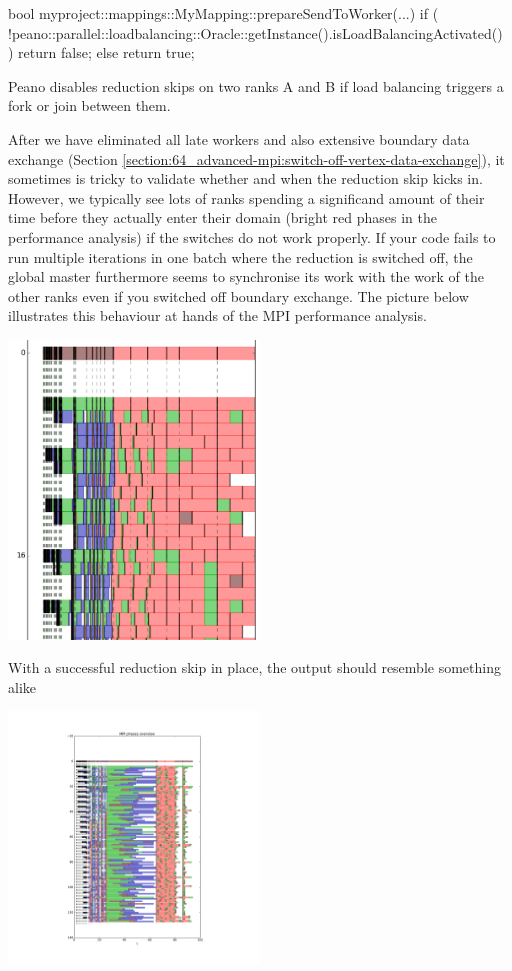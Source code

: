 \begin{code}
bool myproject::mappings::MyMapping::prepareSendToWorker(...) {
  if (
    !peano::parallel::loadbalancing::Oracle::getInstance().isLoadBalancingActivated()
  ) {
    return false;
  }
  else return true;
}
\end{code}


\begin{remark}
Peano disables reduction skips on two ranks A and B if load balancing triggers a
fork or join between them. 
\end{remark}


After we have eliminated all late workers and also 
extensive boundary data exchange (Section
\ref{section:64_advanced-mpi:switch-off-vertex-data-exchange}), it sometimes is
tricky to validate whether and when the reduction skip kicks in.
However, we typically see lots of ranks spending a significand amount of their
time before they actually enter their domain (bright red phases in the
performance analysis) if the switches do not work properly. 
If your code fails to run multiple iterations in one batch where the reduction
is switched off, the global master furthermore seems to synchronise its work
with the work of the other ranks even if you switched off boundary exchange.
The picture below illustrates this behaviour at hands of the MPI performance
analysis.

\begin{center}
  \includegraphics[width=0.5\textwidth]{63_mpi-synchronisation/mpi-phases-late-master.png}
\end{center}

With a successful reduction skip in place, the output should resemble something
alike 

\begin{center}
  \includegraphics[width=0.5\textwidth]{63_mpi-synchronisation/mpi-phases-batched-skip.pdf}
\end{center}
